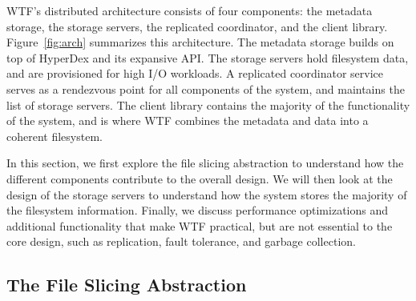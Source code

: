 \documentclass[twocolumn,10pt,letterpaper]{article}
\begin{document}
WTF's distributed architecture consists of four components:  the metadata
storage, the storage servers, the replicated coordinator, and the client
library.  Figure~\ref{fig:arch} summarizes this architecture.  The metadata
storage builds on top of HyperDex and its expansive API.  The storage servers
hold filesystem data, and are provisioned for high I/O workloads.  A replicated
coordinator service serves as a rendezvous point for all components of the
system, and maintains the list of storage servers.  The client library contains
the majority of the functionality of the system, and is where WTF combines the
metadata and data into a coherent filesystem.

In this section, we first explore the file slicing abstraction to understand how
the different components contribute to the overall design.  We will then look at
the design of the storage servers to understand how the system stores the
majority of the filesystem information.  Finally, we discuss performance
optimizations and additional functionality that make WTF practical, but are not
essential to the core design, such as replication, fault tolerance, and garbage
collection.

\subsection{The File Slicing Abstraction}
\end{document}
